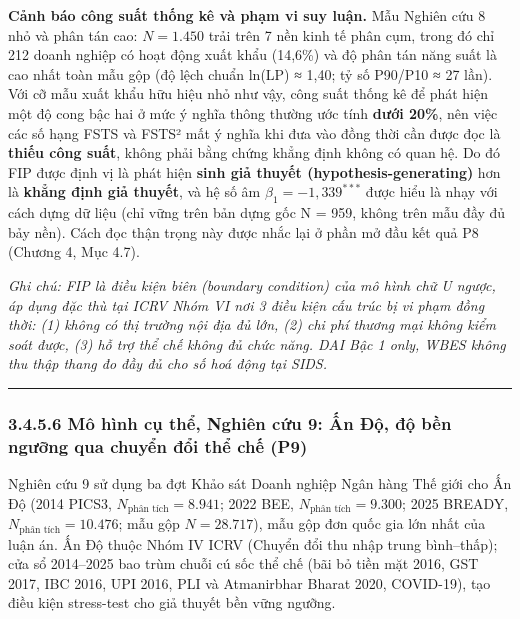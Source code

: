 \documentclass[
  a4paper,
  13pt]{extreport}
\begin{document}
\textbf{Cảnh báo công suất thống kê và phạm vi suy luận.} Mẫu Nghiên cứu
8 nhỏ và phân tán cao: \(N = 1.450\) trải trên 7 nền kinh tế phân cụm,
trong đó chỉ 212 doanh nghiệp có hoạt động xuất khẩu (14,6\%) và độ phân
tán năng suất là cao nhất toàn mẫu gộp (độ lệch chuẩn ln(LP) ≈ 1,40; tỷ
số P90/P10 ≈ 27 lần). Với cỡ mẫu xuất khẩu hữu hiệu nhỏ như vậy, công
suất thống kê để phát hiện một độ cong bậc hai ở mức ý nghĩa thông
thường ước tính \textbf{dưới 20\%}, nên việc các số hạng FSTS và FSTS²
mất ý nghĩa khi đưa vào đồng thời cần được đọc là \textbf{thiếu công
suất}, không phải bằng chứng khẳng định không có quan hệ. Do đó FIP được
định vị là phát hiện \textbf{sinh giả thuyết (hypothesis-generating)}
hơn là \textbf{khẳng định giả thuyết}, và hệ số âm
\(\beta_1 = -1{,}339^{***}\) được hiểu là nhạy với cách dựng dữ liệu
(chỉ vững trên bản dựng gốc N = 959, không trên mẫu đầy đủ bảy nền).
Cách đọc thận trọng này được nhắc lại ở phần mở đầu kết quả P8 (Chương
4, Mục 4.7).

\emph{Ghi chú: FIP là điều kiện biên (boundary condition) của mô hình
chữ U ngược, áp dụng đặc thù tại ICRV Nhóm VI nơi 3 điều kiện cấu trúc
bị vi phạm đồng thời: (1) không có thị trường nội địa đủ lớn, (2) chi
phí thương mại không kiểm soát được, (3) hỗ trợ thể chế không đủ chức
năng. DAI Bậc 1 only, WBES không thu thập thang đo đầy đủ cho số hoá
động tại SIDS.}

\begin{center}\rule{0.5\linewidth}{0.5pt}\end{center}

\hypertarget{muxf4-huxecnh-cux1ee5-thux1ec3-nghiuxean-cux1ee9u-9-ux1ea5n-ux111ux1ed9-ux111ux1ed9-bux1ec1n-ngux1b0ux1ee1ng-qua-chuyux1ec3n-ux111ux1ed5i-thux1ec3-chux1ebf-p9}{%
\subsubsection{3.4.5.6 Mô hình cụ thể, Nghiên cứu 9: Ấn Độ, độ bền
ngưỡng qua chuyển đổi thể chế
(P9)}\label{muxf4-huxecnh-cux1ee5-thux1ec3-nghiuxean-cux1ee9u-9-ux1ea5n-ux111ux1ed9-ux111ux1ed9-bux1ec1n-ngux1b0ux1ee1ng-qua-chuyux1ec3n-ux111ux1ed5i-thux1ec3-chux1ebf-p9}}

Nghiên cứu 9 sử dụng ba đợt Khảo sát Doanh nghiệp Ngân hàng Thế giới cho
Ấn Độ (2014 PICS3, \(N_{\text{phân tích}} = 8.941\); 2022 BEE,
\(N_{\text{phân tích}} = 9.300\); 2025 BREADY,
\(N_{\text{phân tích}} = 10.476\); mẫu gộp \(N = 28.717\)), mẫu gộp đơn
quốc gia lớn nhất của luận án. Ấn Độ thuộc Nhóm IV ICRV (Chuyển đổi thu
nhập trung bình--thấp); cửa sổ 2014--2025 bao trùm chuỗi cú sốc thể chế
(bãi bỏ tiền mặt 2016, GST 2017, IBC 2016, UPI 2016, PLI và Atmanirbhar
Bharat 2020, COVID-19), tạo điều kiện stress-test cho giả thuyết bền
vững ngưỡng.
\end{document}
